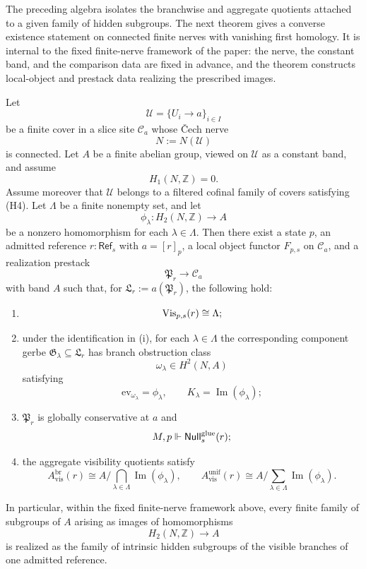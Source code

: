 The preceding algebra isolates the branchwise and aggregate quotients attached to a given family of hidden subgroups. The next theorem gives a converse existence statement on connected finite nerves with vanishing first homology. It is internal to the fixed finite-nerve framework of the paper: the nerve, the constant band, and the comparison data are fixed in advance, and the theorem constructs local-object and prestack data realizing the prescribed images.

\begin{theorem}\label{thm:prescribed-branch-realization}
Let
\[
\mathcal U=\{U_i\to a\}_{i\in I}
\]
be a finite cover in a slice site $\mathcal C_a$ whose \v{C}ech nerve
\[
N:=N(\mathcal U)
\]
is connected. Let $A$ be a finite abelian group, viewed on $\mathcal U$ as a constant band, and assume
\[
H_1(N,\mathbb Z)=0.
\]
Assume moreover that $\mathcal U$ belongs to a filtered cofinal family of covers satisfying \textup{(H4)}. Let $\Lambda$ be a finite nonempty set, and let
\[
\phi_\lambda:H_2(N,\mathbb Z)\to A
\]
be a nonzero homomorphism for each $\lambda\in\Lambda$. Then there exist a state $p$, an admitted reference $r:\mathsf{Ref}_s$ with $a=[r]_p$, a local object functor $F_{p,s}$ on $\mathcal C_a$, and a realization prestack
\[
\mathfrak P_r\to \mathcal C_a
\]
with band $A$ such that, for $\mathfrak L_r:=a(\mathfrak P_r)$, the following hold:
\begin{enumerate}[label=(\roman*),nosep]
\item
\[
\mathrm{Vis}_{p,s}(r)\cong \Lambda;
\]
\item under the identification in \textup{(i)}, for each $\lambda\in\Lambda$ the corresponding component gerbe $\mathfrak G_\lambda\subseteq \mathfrak L_r$ has branch obstruction class
\[
\omega_\lambda\in H^2(N,A)
\]
satisfying
\[
\mathrm{ev}_{\omega_\lambda}=\phi_\lambda,
\qquad
K_\lambda=\operatorname{Im}(\phi_\lambda);
\]
\item $\mathfrak P_r$ is globally conservative at $a$ and
\[
M,p\Vdash \mathsf{Null}^{\mathrm{glue}}_s(r);
\]
\item the aggregate visibility quotients satisfy
\[
A_{\mathrm{vis}}^{\mathrm{br}}(r)\cong A\Big/\bigcap_{\lambda\in\Lambda}\operatorname{Im}(\phi_\lambda),
\qquad
A_{\mathrm{vis}}^{\mathrm{unif}}(r)\cong A\Big/\sum_{\lambda\in\Lambda}\operatorname{Im}(\phi_\lambda).
\]
\end{enumerate}
In particular, within the fixed finite-nerve framework above, every finite family of subgroups of $A$ arising as images of homomorphisms
\[
H_2(N,\mathbb Z)\to A
\]
is realized as the family of intrinsic hidden subgroups of the visible branches of one admitted reference.
\end{theorem}

